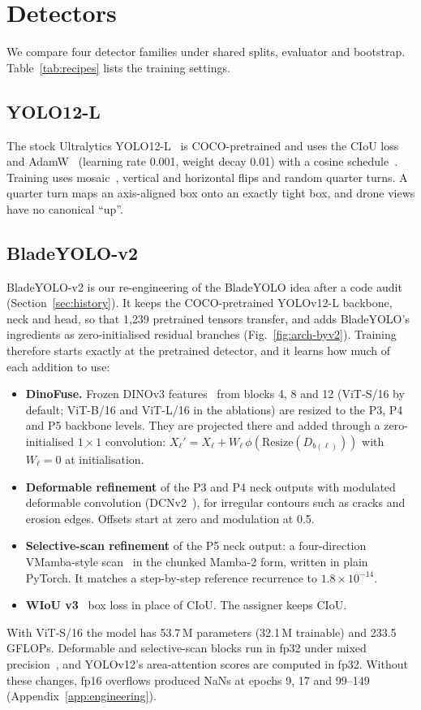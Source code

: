 \section{Detectors}
\label{sec:models}

We compare four detector families under shared splits, evaluator and bootstrap. Table~\ref{tab:recipes} lists the training settings.

\subsection{YOLO12-L}
The stock Ultralytics YOLO12-L~\cite{ultralytics,yolov12} is COCO-pretrained and uses the CIoU loss~\cite{diou} and AdamW~\cite{adamw} (learning rate 0.001, weight decay 0.01) with a cosine schedule~\cite{sgdr}. Training uses mosaic~\cite{yolov4}, vertical and horizontal flips and random quarter turns. A quarter turn maps an axis-aligned box onto an exactly tight box, and drone views have no canonical ``up''.

\subsection{BladeYOLO-v2}
\label{sec:byv2}
BladeYOLO-v2 is our re-engineering of the BladeYOLO idea after a code audit (Section~\ref{sec:history}). It keeps the COCO-pretrained YOLOv12-L backbone, neck and head, so that 1{,}239 pretrained tensors transfer, and adds BladeYOLO's ingredients as zero-initialised residual branches (Fig.~\ref{fig:arch-byv2}). Training therefore starts exactly at the pretrained detector, and it learns how much of each addition to use:
\begin{itemize}
\item \textbf{DinoFuse.} Frozen DINOv3 features~\cite{dinov3} from blocks 4, 8 and 12 (ViT-S/16 by default; ViT-B/16 and ViT-L/16 in the ablations) are resized to the P3, P4 and P5 backbone levels. They are projected there and added through a zero-initialised $1\times1$ convolution: $X_\ell' = X_\ell + W_\ell\,\phi(\mathrm{Resize}(D_{b(\ell)}))$ with $W_\ell=0$ at initialisation.
\item \textbf{Deformable refinement} of the P3 and P4 neck outputs with modulated deformable convolution (DCNv2~\cite{dcnv2}), for irregular contours such as cracks and erosion edges. Offsets start at zero and modulation at 0.5.
\item \textbf{Selective-scan refinement} of the P5 neck output: a four-direction VMamba-style scan~\cite{vmamba,mamba} in the chunked Mamba-2 form, written in plain PyTorch. It matches a step-by-step reference recurrence to $1.8\times10^{-14}$.
\item \textbf{WIoU v3}~\cite{wiou} box loss in place of CIoU. The assigner keeps CIoU.
\end{itemize}
With ViT-S/16 the model has 53.7\,M parameters (32.1\,M trainable) and 233.5 GFLOPs. Deformable and selective-scan blocks run in fp32 under mixed precision~\cite{mixedprecision}, and YOLOv12's area-attention scores are computed in fp32. Without these changes, fp16 overflows produced NaNs at epochs 9, 17 and 99--149 (Appendix~\ref{app:engineering}).

